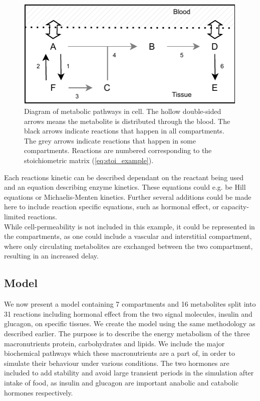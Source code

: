 \documentclass{IEEEtran}
\begin{document}
\begin{figure}[H]
    \centering
    \includegraphics[width=0.8\columnwidth]{Diagrams/example_cell.pdf}
    \caption{Diagram of metabolic pathways in cell. The hollow double-sided arrows means the metabolite is distributed through the blood. The black arrows indicate reactions that happen in all compartments. The grey arrows indicate reactions that happen in some compartments. Reactions are numbered corresponding to the stoichiometric matrix (\ref{eq:stoi_example}).}
    \label{fig:example_metabolic_map}
\end{figure}


Each reactions kinetic can be described dependant on the reactant being used and an equation describing enzyme kinetics. These equations could e.g. be Hill equations or Michaelis-Menten kinetics. Further several additions could be made here to include reaction specific equations, such as hormonal effect, or capacity-limited reactions. \\

While cell-permeability is not included in this example, it could be represented in the compartments, as one could include a vascular and interstitial compartment, where only circulating metabolites are exchanged between the two compartment, resulting in an increased delay.



\newpage
\subsection{Model}



We now present a model containing 7 compartments and 16 metabolites split into 31 reactions including hormonal effect from the two signal molecules, insulin and glucagon, on specific tissues. We create the model using the same methodology as described earlier. The purpose is to describe the energy metabolism of the three macronutrients protein, carbohydrates and lipids. We include the major biochemical pathways which these macronutrients are a part of, in order to simulate their behaviour under various conditions. The two hormones are included to add stability and avoid large transient periods in the simulation after intake of food, as insulin and glucagon are important anabolic and catabolic hormones respectively. \\
\end{document}
